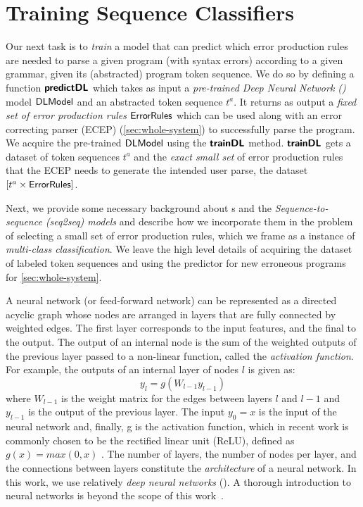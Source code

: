 \section{Training Sequence Classifiers}
\label{sec:seq-classifiers}

Our next task is to \emph{train} a model that can predict which error production
rules are needed to parse a given program (with syntax errors) according to a
given grammar, given its (abstracted) program token sequence.
%
We do so by defining a function $\bm{\mathsf{predictDL}}$ which takes as input a
\emph{pre-trained Deep Neural Network (\dnn)} model $\mathsf{DLModel}$ and an abstracted
token sequence $t^a$.
%
It returns as output a \emph{fixed set of error production rules}
$\mathsf{ErrorRules}$ which can be used along with an error correcting parser (ECEP)
(\autoref{sec:whole-system}) to successfully parse the program.
%
We acquire the pre-trained $\mathsf{DLModel}$ using the $\bm{\mathsf{trainDL}}$ method.
$\bm{\mathsf{trainDL}}$ gets a dataset of token sequences $t^a$ and the \emph{exact small
set} of error production rules that the ECEP needs to generate the intended user
parse, \ie the dataset $[t^a \times \mathsf{ErrorRules}]$.

Next, we provide some necessary background about \dnn{}s and the
\emph{Sequence-to-sequence (seq2seq) models} and describe how we incorporate
them in the problem of selecting a small set of error production rules, which we
frame as a instance of \emph{multi-class classification}. We leave the high
level details of acquiring the dataset of labeled token sequences and using the
predictor for new erroneous programs for \autoref{sec:whole-system}.

A neural network (or feed-forward network) can be represented as a directed
acyclic graph whose nodes are arranged in layers that are fully connected by
weighted edges. The first layer corresponds to the input features, and the final
to the output. The output of an internal node is the sum of the weighted outputs
of the previous layer passed to a non-linear function, called the
\emph{activation function}. For example, the outputs of an internal layer of
nodes $l$ is given as:
\begin{equation*}
    y_l = g(W_{l-1} y_{l-1})
\end{equation*}
where $W_{l-1}$ is the weight matrix for the edges between layers $l$ and $l-1$
and $y_{l-1}$ is the output of the previous layer. The input $y_0 = x$ is the
input of the neural network and, finally, g is the activation function, which in
recent work is commonly chosen to be the rectified linear unit (ReLU), defined
as $g(x) = max(0, x)$ \citep{Nair2010-xg}.  The number of layers, the number of
nodes per layer, and the connections between layers constitute the
\emph{architecture} of a neural network. In this work, we use relatively
\emph{deep neural networks} (\dnn). A thorough introduction to neural networks
is beyond the scope of this work~\citep{Hastie2009-bn, Nielsen2015-pu}.



